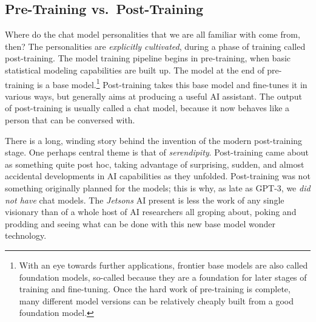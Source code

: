 \subsection{Pre-Training vs.\ Post-Training}
Where do the chat model personalities that we are all familiar with come from,
then? The personalities are \emph{explicitly cultivated}, during a phase of
training called post-training. The model training pipeline begins in
pre-training, when basic statistical modeling capabilities are built up. The
model at the end of pre-training is a base model.\footnote{With an eye towards
further applications, frontier base models are also called foundation models,
so-called because they are a foundation for later stages of training and
fine-tuning. Once the hard work of pre-training is complete, many different
model versions can be relatively cheaply built from a good foundation model.}
Post-training takes this base model and fine-tunes it in various ways, but
generally aims at producing a useful AI assistant. The output of post-training
is usually called a chat model, because it now behaves like a person that can
be conversed with.

There is a long, winding story behind the invention of the modern post-training
stage. One perhaps central theme is that of \emph{serendipity}. Post-training
came about as something quite post hoc, taking advantage of surprising, sudden,
and almost accidental developments in AI capabilities as they unfolded.
Post-training was not something originally planned for the models; this is why,
as late as GPT-3, we \emph{did not have} chat models. The \emph{Jetsons} AI
present is less the work of any single visionary than of a whole host of AI
researchers all groping about, poking and prodding and seeing what can be done
with this new base model wonder technology.

